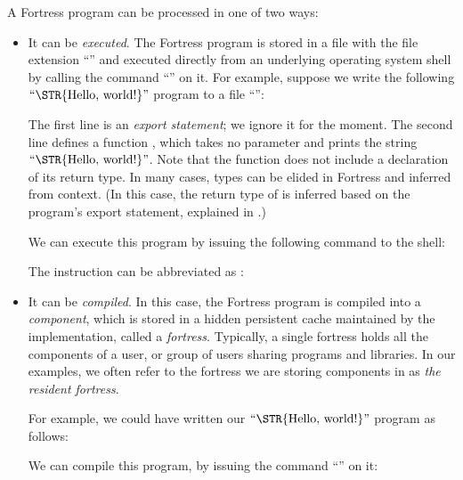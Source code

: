 A Fortress program can be processed in one of two ways:

\begin{itemize}

\item It can be \emph{executed}. The Fortress program is stored in a file with
the file extension ``'' and executed directly from an underlying
operating
system shell by calling the command ``'' on it.
For example,
suppose we write the following \(\hbox{\rm``\STR{Hello,~world!}''}\) program
to a file ``'':


The first line is an \emph{export statement};
we ignore it for the moment.
The second line defines a function ,
which takes no parameter
and prints the string \(\hbox{\rm``\STR{Hello,~world!}''}\).
Note that the function 
does not include a declaration of its return type.
In many cases,
 types can be elided in Fortress and inferred from context.
(In this case,
the return type of  is inferred based on the program's export statement,
explained in .)

We can execute this program by issuing the following command to the shell:


The instruction  can be abbreviated as :


\item It can be \emph{compiled}. In this case, the Fortress program is
compiled into a
\emph{component}, which is stored in a hidden persistent cache maintained by the implementation,
called a \emph{fortress}. Typically, a single fortress holds all the components
of a user, or group of users sharing programs and libraries.
In our examples,
we often refer to the fortress we are storing components in
as \emph{the resident fortress}.

For example, we could have written our \(\hbox{\rm``\STR{Hello,~world!}''}\)
program as follows:


We can compile this program, by issuing the command
``'' on it:



\end{itemize}
